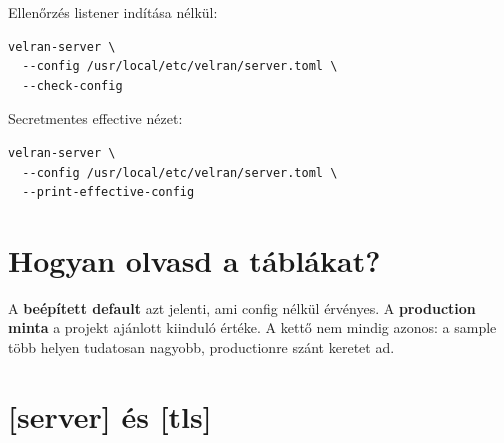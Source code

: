 Ellenőrzés listener indítása nélkül:

\begin{lstlisting}
velran-server \
  --config /usr/local/etc/velran/server.toml \
  --check-config
\end{lstlisting}

Secretmentes effective nézet:

\begin{lstlisting}
velran-server \
  --config /usr/local/etc/velran/server.toml \
  --print-effective-config
\end{lstlisting}

\section{Hogyan olvasd a táblákat?}

A \textbf{beépített default} azt jelenti, ami config nélkül érvényes. A \textbf{production minta} a projekt  ajánlott kiinduló értéke. A kettő nem mindig azonos: a sample több helyen tudatosan nagyobb, productionre szánt keretet ad.

\section{[server] és [tls]}

